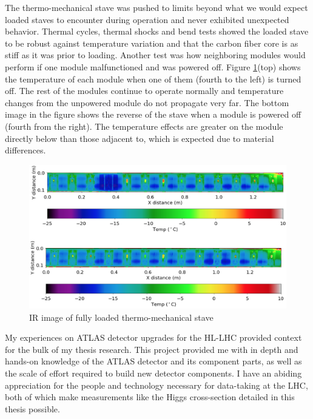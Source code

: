 The thermo-mechanical stave was pushed to limits beyond what we would expect loaded staves to encounter during operation and never exhibited unexpected behavior. Thermal cycles, thermal shocks and bend tests showed the loaded stave to be robust against temperature variation and that the carbon fiber core is as stiff as it was prior to loading. Another test was how neighboring modules would perform if one module malfunctioned and was powered off. Figure \ref{fig:moduleoff}(top) shows the temperature of each module when one of them (fourth to the left) is turned off. The rest of the modules continue to operate normally and temperature changes from the unpowered module do not propagate very far. The bottom image in the figure shows the reverse of the stave when a module is powered off (fourth from the right). The temperature effects are greater on the module directly below than those adjacent to, which is expected due to material differences. 

\begin{figure}[!h]
        \centering
    \includegraphics[width=.7\textwidth]{Pictures/moduleoff.png}
    \caption{IR image of fully loaded thermo-mechanical stave}
    \label{fig:moduleoff}
\end{figure}

My experiences on ATLAS detector upgrades for the HL-LHC provided context for the bulk of my thesis research. This project provided me with in depth and hands-on knowledge of the ATLAS detector and its component parts, as well as the scale of effort required to build new detector components. I have an abiding appreciation for the people and technology necessary for data-taking at the LHC, both of which make measurements like the Higgs cross-section detailed in this thesis possible.
